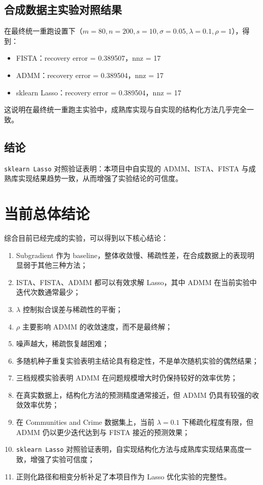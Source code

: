 \documentclass[12pt,a4paper]{ctexart}
\begin{document}
\subsection{合成数据主实验对照结果}
在最终统一重跑设置下（$m=80,n=200,s=10,\sigma=0.05,\lambda=0.1,\rho=1$），得到：
\begin{itemize}[leftmargin=2em]
    \item FISTA：recovery error = 0.389507，nnz = 17
    \item ADMM：recovery error = 0.389504，nnz = 17
    \item sklearn Lasso：recovery error = 0.389504，nnz = 17
\end{itemize}

这说明在最终统一重跑主实验中，成熟库实现与自实现的结构化方法几乎完全一致。

\subsection{结论}
\texttt{sklearn Lasso} 对照验证表明：本项目中自实现的 ADMM、ISTA、FISTA 与成熟库实现结果趋势一致，从而增强了实验结论的可信度。

\section{当前总体结论}
综合目前已经完成的实验，可以得到以下核心结论：
\begin{enumerate}[label=\arabic*.]
    \item Subgradient 作为 baseline，整体收敛慢、稀疏性差，在合成数据上的表现明显弱于其他三种方法；
    \item ISTA、FISTA、ADMM 都可以有效求解 Lasso，其中 ADMM 在当前实验中迭代次数通常最少；
    \item $\lambda$ 控制拟合误差与稀疏性的平衡；
    \item $\rho$ 主要影响 ADMM 的收敛速度，而不是最终解；
    \item 噪声越大，稀疏恢复越困难；
    \item 多随机种子重复实验表明主结论具有稳定性，不是单次随机实验的偶然结果；
    \item 三档规模实验表明 ADMM 在问题规模增大时仍保持较好的效率优势；
    \item 在真实数据上，结构化方法的预测精度通常接近，但 ADMM 仍具有较强的收敛效率优势；
    \item 在 Communities and Crime 数据集上，当前 $\lambda=0.1$ 下稀疏化程度有限，但 ADMM 仍以更少迭代达到与 FISTA 接近的预测效果；
    \item \texttt{sklearn Lasso} 对照验证表明，自实现结构化方法与成熟库实现结果高度一致，增强了实验可信度；
    \item 正则化路径和相变分析补足了本项目作为 Lasso 优化实验的完整性。
\end{enumerate}
\end{document}
